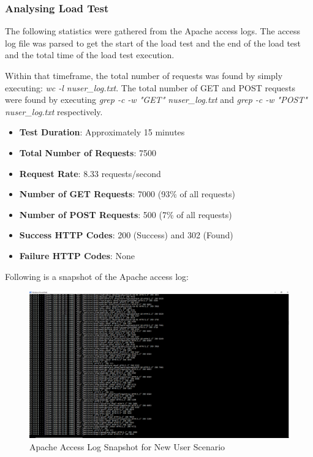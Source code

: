 \documentclass[fontsize=12pt,paper=letter,twoside]{scrartcl}
\begin{document}
\subsubsection{Analysing Load Test}
The following statistics were gathered from the Apache access logs. The access log file was parsed to get the start of the load test and the end of the load test and the total time of the load test execution.

\bigskip
\noindent Within that timeframe, the total number of requests was found by simply executing: \emph{wc -l nuser\_log.txt}. The total number of GET and POST requests were found by executing \emph{grep -c -w "GET" nuser\_log.txt} and \emph{grep -c -w "POST" nuser\_log.txt} respectively.

\begin{itemize}
\item \textbf{Test Duration}: Approximately 15 minutes
\item \textbf{Total Number of Requests}: 7500
\item \textbf{Request Rate}: 8.33 requests/second
\item \textbf{Number of GET Requests}: 7000 (93\% of all requests)
\item \textbf{Number of POST Requests}: 500 (7\% of all requests)
\item \textbf{Success HTTP Codes}: 200 (Success) and 302 (Found)
\item \textbf{Failure HTTP Codes}: None
\end{itemize}

\bigskip
\noindent Following is a snapshot of the Apache access log:
\begin{figure}[!htb]
\begin{center}
\includegraphics[width=.8\textwidth]{../../load-test/test-plans/new-user/access-log.png}
\end{center}
\caption{Apache Access Log Snapshot for New User Scenario}
\label{fig:nuser:access_log}
\end{figure}
\end{document}
